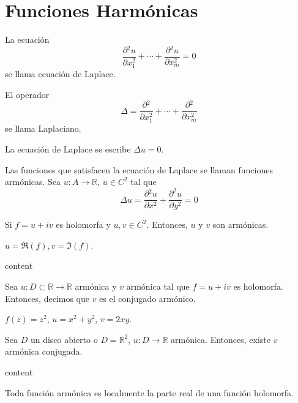 \section{Funciones Harmónicas}

\begin{defn}
  La ecuación
  \[ 
    \frac{\partial{^{2}u}}{\partial{x_{1}^{2}}} + \cdots +  \frac{\partial{^{2}u}}{\partial{x_{m}^{2}}} = 0
  \] 
  se llama ecuación de Laplace.
\end{defn}

\begin{defn}[Laplaciano]
  El operador
  \[ 
    \Delta = \frac{\partial{^{2}}}{\partial{x_{1}^{2}}} + \cdots +  \frac{\partial{^{2}}}{\partial{x_{m}^{2}}}
  \] 
  se llama Laplaciano.
\end{defn}

\begin{obs}
  La ecuación de Laplace se escribe $\Delta u = 0$.
\end{obs}

\begin{defn}
  Las funciones que satisfacen la ecuación de Laplace se llaman funciones armónicas. Sea $u: A \to \mathbb{R}$, $u \in C^{2}$ tal que 
  \[ 
    \Delta u = \frac{\partial{^{2}u}}{\partial{x^{2}}} + \frac{\partial^2{u}}{\partial{y}^2} = 0 
  \] 
\end{defn}

\begin{theo}
  Si $f = u + i v$ es holomorfa y $u, v \in C^{2}$. Entonces, $u$ y $v$ son armónicas.
\end{theo}

\begin{obs}
  $u = \Re(f), v = \Im(f)$.
\end{obs}

\begin{dem}
  content
\end{dem}

\begin{defn}
  Sea $u: D \subset \mathbb{R} \to \mathbb{R}$ armónica y $v$ armónica tal que $f = u + i v$ es holomorfa. Entonces, decimos que $v$ es el conjugado armónico.
\end{defn}

\begin{ejm}
  $f(z) = z^{2}$, $u = x^{2} + y^{2}$, $v = 2xy$.
\end{ejm}

\begin{theo}
  Sea $D$ un disco abierto o $D = \mathbb{R}^{2}$, $u: D \to \mathbb{R}$ armónica. Entonces, existe $v$ armónica conjugada.
\end{theo}

 \begin{dem}
   content
 \end{dem}

 \begin{cor}
   Toda función armónica es localmente la parte real de una función holomorfa.
 \end{cor}
